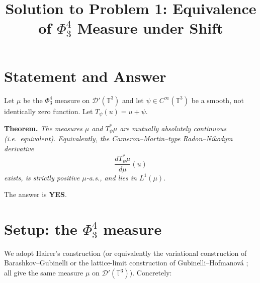 

\title{Solution to Problem 1: Equivalence of $\Phi^4_3$ Measure under Shift}
\date{}


\maketitle

\section*{Statement and Answer}

Let $\mu$ be the $\Phi^4_3$ measure on $\mathcal D'(\mathbb T^3)$ and let $\psi\in C^\infty(\mathbb T^3)$ be a smooth, not identically zero function.  Let $T_\psi(u)=u+\psi$.

\medskip
\noindent\textbf{Theorem.}  \emph{The measures $\mu$ and $T_\psi^*\mu$ are mutually absolutely continuous (i.e.\ equivalent).  Equivalently, the Cameron--Martin--type Radon--Nikodym derivative
\[
\frac{dT_\psi^*\mu}{d\mu}(u)
\]
exists, is strictly positive $\mu$-a.s., and lies in $L^1(\mu)$.}

\medskip
\noindent The answer is \textbf{YES}.

\section*{Setup: the $\Phi^4_3$ measure}

We adopt Hairer's construction \cite{Hairer14,HairerMatetski18} (or equivalently the variational construction of Barashkov--Gubinelli \cite{BG20} or the lattice-limit construction of Gubinelli--Hofmanová \cite{GH21}; all give the same measure $\mu$ on $\mathcal D'(\mathbb T^3)$).  Concretely:

